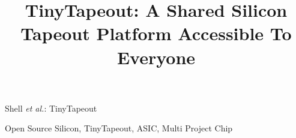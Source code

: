 \documentclass[journal]{IEEEtran}
\begin{document}
\title{TinyTapeout: A Shared Silicon Tapeout Platform Accessible To Everyone}



%
{Shell \MakeLowercase{\textit{et al.}}: TinyTapeout}


\maketitle


\begin{IEEEkeywords}
Open Source Silicon, TinyTapeout, ASIC, Multi Project Chip
\end{IEEEkeywords}











%
%





\end{document}
